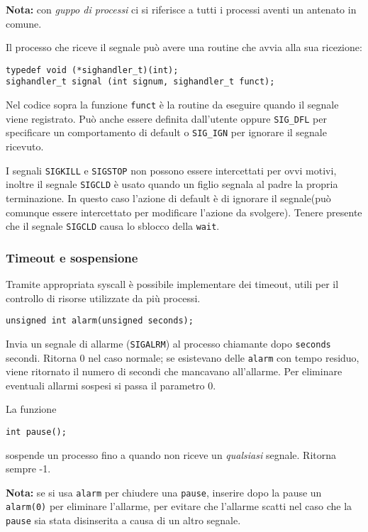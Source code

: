 \documentclass[a4paper]{article}
\begin{document}
\textbf{Nota:} con \textit{guppo di processi} ci si riferisce a tutti i processi aventi un antenato in comune.

Il processo che riceve il segnale può avere una routine che avvia alla sua ricezione:
\begin{verbatim}
typedef void (*sighandler_t)(int);
sighandler_t signal (int signum, sighandler_t funct);
\end{verbatim}
Nel codice sopra la funzione \verb|funct| è la routine da eseguire quando il segnale viene registrato. Può anche essere definita dall'utente oppure \verb|SIG_DFL| per specificare un comportamento di default o \verb|SIG_IGN| per ignorare il segnale ricevuto.



I segnali \verb|SIGKILL| e \verb|SIGSTOP| non possono essere intercettati per ovvi motivi, inoltre il segnale \verb|SIGCLD| è usato quando un figlio segnala al padre la propria terminazione. In questo caso l'azione di default è di ignorare il segnale(può comunque essere intercettato per modificare l'azione da svolgere). Tenere presente che il segnale \verb|SIGCLD| causa lo sblocco della \verb|wait|.

\subsubsection{Timeout e sospensione}
Tramite appropriata syscall è possibile implementare dei timeout, utili per il controllo di risorse utilizzate da più processi.
\begin{verbatim}
unsigned int alarm(unsigned seconds);
\end{verbatim}
Invia un segnale di allarme (\verb|SIGALRM|) al processo chiamante dopo \verb|seconds| secondi. Ritorna 0 nel caso normale; se esistevano delle \verb|alarm| con tempo residuo, viene ritornato il numero di secondi che mancavano all'allarme.
Per eliminare eventuali allarmi sospesi si passa il parametro 0.

La funzione 
\begin{verbatim}
int pause();
\end{verbatim}
sospende un processo fino a quando non riceve un \textit{qualsiasi} segnale. Ritorna sempre -1.

\textbf{Nota:} se si usa \verb|alarm| per chiudere una \verb|pause|, inserire dopo la pause un \verb|alarm(0)| per eliminare l'allarme, per evitare che l'allarme scatti nel caso che la \verb|pause| sia stata disinserita a causa di un altro segnale.
\end{document}
